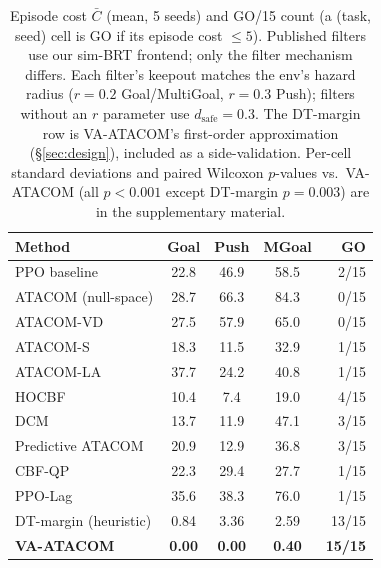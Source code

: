 \documentclass[letterpaper]{article}
\begin{document}
\begin{table}[t]
\centering
\caption{Episode cost $\bar{C}$ (mean, 5 seeds) and GO/15 count (a (task, seed) cell is GO if its episode cost $\le 5$). Published filters use our sim-BRT frontend; only the filter mechanism differs. Each filter's keepout matches the env's hazard radius ($r{=}0.2$ Goal/MultiGoal, $r{=}0.3$ Push); filters without an $r$ parameter use $d_{\text{safe}}{=}0.3$. The DT-margin row is VA-ATACOM's first-order approximation (\S\ref{sec:design}), included as a side-validation. Per-cell standard deviations and paired Wilcoxon $p$-values vs.\ VA-ATACOM (all $p\!<\!0.001$ except DT-margin $p\!=\!0.003$) are in the supplementary material.}
\label{tab:main}
\setlength{\tabcolsep}{4pt}
\begin{tabular}{lcccr}
\toprule
Method & Goal & Push & MGoal & GO \\
\midrule
PPO baseline       & 22.8 & 46.9 & 58.5 & 2/15 \\
\midrule
ATACOM (null-space)& 28.7 & 66.3 & 84.3 & 0/15 \\
ATACOM-VD          & 27.5 & 57.9 & 65.0 & 0/15 \\
ATACOM-S           & 18.3 & 11.5 & 32.9 & 1/15 \\
ATACOM-LA          & 37.7 & 24.2 & 40.8 & 1/15 \\
HOCBF              & 10.4 & 7.4  & 19.0 & 4/15 \\
DCM                & 13.7 & 11.9 & 47.1 & 3/15 \\
Predictive ATACOM  & 20.9 & 12.9 & 36.8 & 3/15 \\
CBF-QP             & 22.3 & 29.4 & 27.7 & 1/15 \\
PPO-Lag            & 35.6 & 38.3 & 76.0 & 1/15 \\
\midrule
DT-margin (heuristic) & 0.84 & 3.36 & 2.59 & 13/15 \\
\textbf{VA-ATACOM}    & \textbf{0.00} & \textbf{0.00} & \textbf{0.40} & \textbf{15/15} \\
\bottomrule
\end{tabular}
\end{table}
\end{document}
